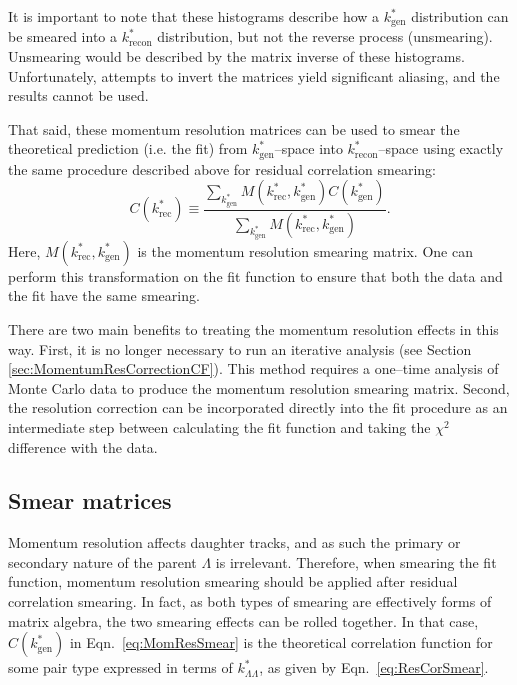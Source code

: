 It is important to note that these histograms describe how a $k^*_\mathrm{gen}$ distribution can be smeared into a $k^*_\mathrm{recon}$ distribution, but not the reverse process (unsmearing).
Unsmearing would be described by the matrix inverse of these histograms.
Unfortunately, attempts to invert the matrices yield significant aliasing, and the results cannot be used.

That said, these momentum resolution matrices can be used to smear the theoretical prediction (i.e. the fit) from $k^*_\mathrm{gen}$--space into $k^*_\mathrm{recon}$--space using exactly the same procedure described above for residual correlation smearing:
\begin{equation}
\label{eq:MomResSmear}
C(k^*_{\mathrm{rec}}) \equiv \frac{\displaystyle\sum\limits_{k^*_{\mathrm{gen}}}M(k^*_{\mathrm{rec}},k^*_{\mathrm{gen}})C(k^*_{\mathrm{gen}})}{\displaystyle\sum\limits_{k^*_{\mathrm{gen}}}M(k^*_{\mathrm{rec}},k^*_{\mathrm{gen}})}.
\end{equation} 
Here, $M(k^*_{\mathrm{rec}},k^*_{\mathrm{gen}})$ is the momentum resolution smearing matrix.
One can perform this transformation on the fit function to ensure that both the data and the fit have the same smearing. 

There are two main benefits to treating the momentum resolution effects in this way. 
First, it is no longer necessary to run an iterative analysis (see Section \ref{sec:MomentumResCorrectionCF}). 
This method requires a one--time analysis of Monte Carlo data to produce the momentum resolution smearing matrix. 
Second, the resolution correction can be incorporated directly into the fit procedure as an intermediate step between calculating the fit function and taking the $\chi^2$ difference with the data.

\subsection{Smear matrices}
\label{sec:SmearMath}
Momentum resolution affects daughter tracks, and as such the primary or secondary nature of the parent $\Lambda$ is irrelevant.
Therefore, when smearing the fit function, momentum resolution smearing should be applied after residual correlation smearing. 
In fact, as both types of smearing are effectively forms of matrix algebra, the two smearing effects can be rolled together. 
In that case, $C(k^*_\mathrm{gen})$ in Eqn.\ \ref{eq:MomResSmear} is the theoretical correlation function for some pair type expressed in terms of $k^*_{\Lambda\Lambda}$, as given by Eqn.\ \ref{eq:ResCorSmear}.

